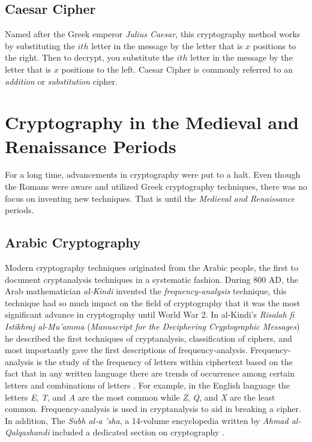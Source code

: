 \subsection{Caesar Cipher}

Named after the Greek emperor \textit{Julius Caesar}, this cryptography method works by substituting the $ith$ letter in the 
message by the letter that is $x$ positions to the right. Then to decrypt, you substitute the $ith$ letter in the message by 
the letter that is $x$ positions to the left. Caesar Cipher is commonly referred to an \textit{addition} or \textit{substitution} 
cipher.

\section{Cryptography in the Medieval and Renaissance Periods}

For a long time, advancements in cryptography were put to a halt. Even though the Romans were aware and utilized Greek 
cryptography techniques, there was no focus on inventing new techniques. That is until the \textit{Medieval and Renaissance}
periods.

\subsection{Arabic Cryptography}

Modern cryptography techniques originated from the Arabic people, the first to document cryptanalysis techniques 
in a systematic fashion. During 800 AD, the Arab mathematician \textit{al-Kindi} invented the \textit{frequency-analysis} 
technique, this technique had so much impact on the field of cryptography that it was the most significant advance in
cryptography until World War 2. In al-Kindi's \textit{Risalah fi Istikhraj al-Mu'amma} 
(\textit{Manuscript for the Deciphering Cryptographic Messages}) he described the first techniques of cryptanalysis,
classification of ciphers, and most importantly gave the first descriptions of frequency-analysis.
Frequency-analysis is the study of the frequency of letters within ciphertext based on the fact that in any
written language there are trends of occurrence among certain letters and combinations of letters \cite{wiki:frequency_analysis}. For example, in the
English language the letters \textit{E}, \textit{T}, and \textit{A} are the most common while \textit{Z}, \textit{Q}, and \textit{X} are the least common. 
Frequency-analysis is used in cryptanalysis to aid in breaking a cipher. In addition, The \textit{Subh al-a 'sha}, a 14-volume encyclopedia written by 
\textit{Ahmad al-Qalqashandi} included a dedicated section on cryptography \cite{wiki:history_of_cryptography}.
 
